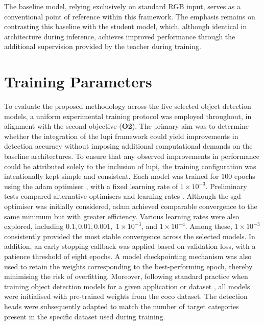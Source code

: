 The baseline model, relying exclusively on standard RGB input, serves as a conventional point of reference within this framework. The emphasis remains on contrasting this baseline with the student model, which, although identical in architecture during inference, achieves improved performance through the additional supervision provided by the teacher during training.


\section{Training Parameters}
\label{sec:4_training_params}

To evaluate the proposed methodology across the five selected object detection models, a uniform experimental training protocol was employed throughout, in alignment with the second objective (\textbf{O2}). The primary aim was to determine whether the integration of the \gls{lupi} framework could yield improvements in detection accuracy without imposing additional computational demands on the baseline architectures. To ensure that any observed improvements in performance could be attributed solely to the inclusion of \gls{lupi}, the training configuration was intentionally kept simple and consistent. Each model was trained for $100$ epochs using the \gls{adam} optimiser \cite{adam_optimizer}, with a fixed learning rate of \(1 \times 10^{-3}\).
Preliminary tests compared alternative optimisers and learning rates \cite{sgd_optimizer}. Although the \gls{sgd} optimiser was initially considered, \gls{adam} achieved comparable convergence to the same minimum but with greater efficiency. Various learning rates were also explored, including $0.1, 0.01, 0.001,$ \(1 \times 10^{-3}\), and \(1 \times 10^{-4}\). Among these, \(1 \times 10^{-3}\) consistently provided the most stable convergence across the selected models. 
In addition, an early stopping callback was applied based on validation loss, with a patience threshold of eight epochs. A model checkpointing mechanism was also used to retain the weights corresponding to the best-performing epoch, thereby minimising the risk of overfitting.
Moreover, following standard practice when training object detection models for a given application or dataset \cite{yolov12, soda_dataset, fasterrcnn, yolov10}, all models were initialised with pre-trained weights from the \gls{coco} dataset. The detection heads were subsequently adapted to match the number of target categories present in the specific dataset used during training.

